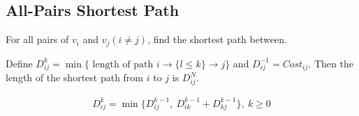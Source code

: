 \subsection{All-Pairs Shortest Path}
For all pairs of $v_i$ and $v_j ( i \ne j )$, find the shortest path between.

Define  
$D^k_{ij} = \min\{\text{ length of path }i \rightarrow \{ l \le k \} \rightarrow j \}$  and  $D^{-1}_{ij} = Cost_{ij}$.   Then the length of the shortest path from $i$ to $j$  is $D^N_{ij}$. 

\begin{align*}
    D^k_{ij}=\min\{ D^{k-1}_{ij},\ D^{k-1}_{ik}+D^{k-1}_{kj} \},\ k\ge 0
\end{align*}